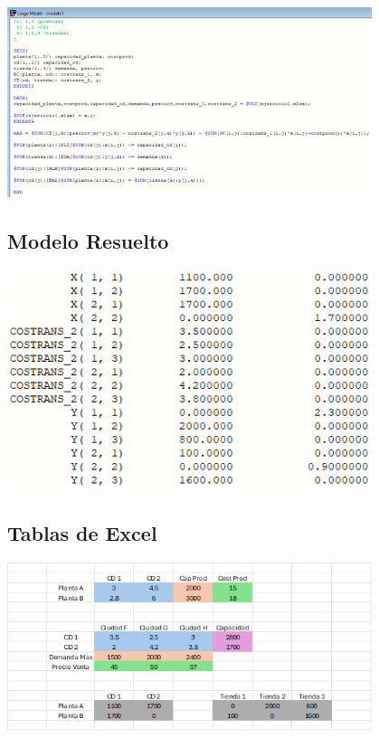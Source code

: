\documentclass[12pt]{article}
\begin{document}
\begin{center}
  \includegraphics[width=0.8\textwidth]{./assets/model1.PNG}
\end{center}

\subsection*{Modelo Resuelto}
\begin{center}
  \includegraphics[width=0.8\textwidth]{./assets/solved_model1.PNG}
\end{center}

\subsection*{Tablas de Excel}
\begin{center}
  \includegraphics[width=0.8\textwidth]{./assets/excel1.png}
\end{center}
\end{document}
